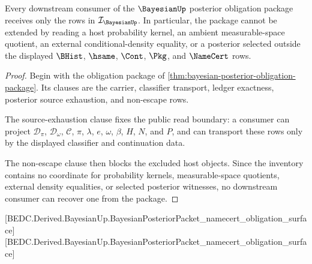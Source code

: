 \begin{theorem}
\label{thm:bayesian-posterior-obligation-non-escape}
Every downstream consumer of the $\BayesianUp$ posterior obligation package receives only the rows in $\mathcal{I}_{\BayesianUp}$. In particular, the package cannot be extended by reading a host probability kernel, an ambient measurable-space quotient, an external conditional-density equality, or a posterior selected outside the displayed $\BHist$, $\hsame$, $\Cont$, $\Pkg$, and $\NameCert$ rows.
\end{theorem}
\begin{proof}
Begin with the obligation package of \autoref{thm:bayesian-posterior-obligation-package}. Its clauses are the carrier, classifier transport, ledger exactness, posterior source exhaustion, and non-escape rows.

The source-exhaustion clause fixes the public read boundary: a consumer can project $\mathcal{D}_{\pi}$, $\mathcal{D}_{\omega}$, $\mathcal{C}$, $\pi$, $\lambda$, $e$, $\omega$, $\beta$, $H$, $N$, and $P$, and can transport these rows only by the displayed classifier and continuation data.

The non-escape clause then blocks the excluded host objects. Since the inventory contains no coordinate for probability kernels, measurable-space quotients, external density equalities, or selected posterior witnesses, no downstream consumer can recover one from the package.
\end{proof}

[BEDC.Derived.BayesianUp.BayesianPosteriorPacket\_namecert\_obligation\_surface]
[BEDC.Derived.BayesianUp.BayesianPosteriorPacket\_namecert\_obligation\_surface]

\begin{closurestatus}{\BayesianUp}
  \theoryclosure{\scopedClosure}
  \formalstatus{\axiomCleanV}
\end{closurestatus}
